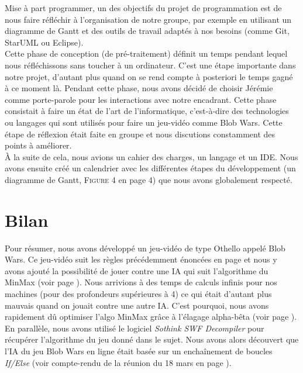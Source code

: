 \documentclass[11pt,a4paper]{article}
\begin{document}
    Mise à part programmer, un des objectifs du projet de programmation est de nous faire réfléchir à l'organisation de notre groupe, par exemple en utilisant un diagramme de Gantt et des outils de travail adaptés à nos besoins (comme Git, StarUML ou Eclipse).\\
    
    Cette phase de conception (de pré-traitement) définit un temps pendant lequel nous réfléchissons sans toucher à un ordinateur. C'est une étape importante dans notre projet, d'autant plus quand on se rend compte à posteriori le temps gagné à ce moment là. Pendant cette phase, nous avons décidé de choisir Jérémie comme porte-parole pour les interactions avec notre encadrant. Cette phase consistait à faire un état de l'art de l'informatique, c'est-à-dire des technologies ou langages qui sont utilisés pour faire un jeu-vidéo comme Blob Wars. Cette étape de réflexion était faite en groupe et nous discutions constamment des points à améliorer.\\
    
    À la suite de cela, nous avions un cahier des charges, un langage et un IDE. Nous avons ensuite créé un calendrier avec les différentes étapes du développement (un diagramme de Gantt, \textsc{Figure} 4 en page 4) que nous avons globalement respecté.\\
    
\section{Bilan}

    Pour résumer, nous avons développé un jeu-vidéo de type Othello appelé Blob Wars. Ce jeu-vidéo suit les règles précédemment énoncées en page \pageref{item:regle} et nous y avons ajouté la possibilité de jouer contre une IA qui suit l'algorithme du MinMax (voir page \pageref{algo:max}). Nous arrivions à des temps de calculs infinis pour nos machines (pour des profondeurs supérieures à 4) ce qui était d'autant plus mauvais quand on jouait contre une autre IA. C'est pourquoi, nous avons rapidement dû optimiser l'algo MinMax grâce à l'élagage alpha-bêta (voir page \pageref{fig:alphabeta}).\\
    
    En parallèle, nous avons utilisé le logiciel \textit{Sothink SWF Decompiler} pour récupérer l'algorithme du jeu donné dans le sujet. Nous avons alors découvert que l'IA du jeu Blob Wars en ligne était basée sur un enchaînement de boucles \textit {If/Else} (voir compte-rendu de la réunion du 18 mars en page \pageref{entrevue:18mars}).\\
    
\end{document}
